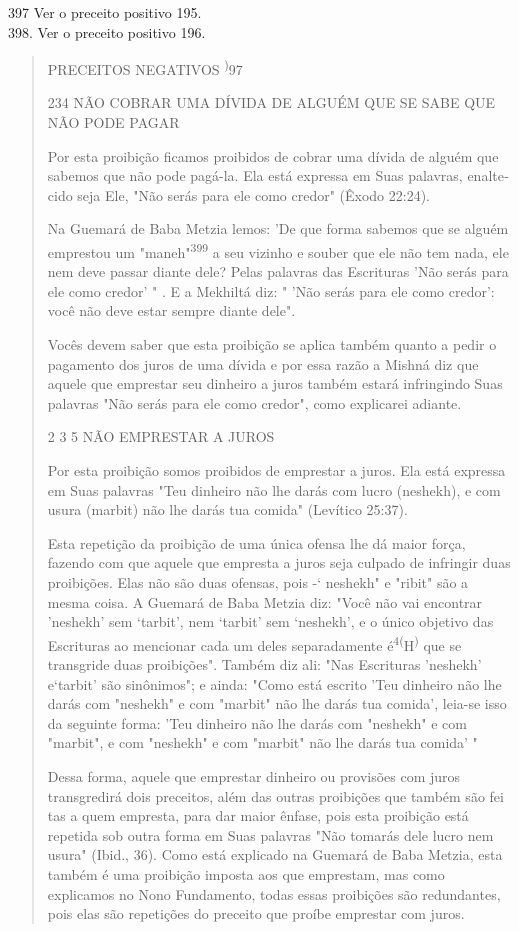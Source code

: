 397 Ver o preceito positivo 195.\\
398. Ver o preceito positivo 196.

\begin{quote}
PRECEITOS NEGATIVOS \textsuperscript{)}97

234 NÃO COBRAR UMA DÍVIDA DE ALGUÉM QUE SE SABE QUE NÃO PODE PAGAR

Por esta proibição ficamos proibidos de cobrar uma dívida de alguém que
sabemos que não pode pagá-la. Ela está expressa em Suas palavras,
enalte­cido seja Ele, "Não serás para ele como credor" (Êxodo 22:24).

Na Guemará de Baba Metzia lemos: 'De que forma sabemos que se alguém
emprestou um "maneh"\textsuperscript{399} a seu vizinho e souber que ele
não tem na­da, ele nem deve passar diante dele? Pelas palavras das
Escrituras 'Não serás para ele como credor' " . E a Mekhiltá diz: " 'Não
serás para ele como credor': você não deve estar sempre diante dele".

Vocês devem saber que esta proibição se aplica também quanto a pedir o
pagamento dos juros de uma dívida e por essa razão a Mishná diz que
aquele que emprestar seu dinheiro a juros também estará infringindo Suas
pala­vras "Não serás para ele como credor", como explicarei adiante.

2 3 5 NÃO EMPRESTAR A JUROS

Por esta proibição somos proibidos de emprestar a juros. Ela está
expressa em Suas palavras "Teu dinheiro não lhe darás com lucro
(neshekh), e com usura (marbit) não lhe darás tua comida" (Levítico
25:37).

Esta repetição da proibição de uma única ofensa lhe dá maior força,
fazendo com que aquele que empresta a juros seja culpado de infringir
duas proibições. Elas não são duas ofensas, pois -` neshekh" e "ribit"
são a mesma coisa. A Guemará de Baba Metzia diz: "Você não vai encontrar
'neshekh' sem `tarbit', nem `tarbit' sem `neshekh', e o único objetivo
das Escrituras ao men­cionar cada um deles separadamente
é\textsuperscript{4(}H\textsuperscript{)} que se transgride duas
proibições". Também diz ali: "Nas Escrituras 'neshekh' e`tarbit' são
sinônimos"; e ainda: "Como está escrito 'Teu dinheiro não lhe darás com
"neshekh" e com "mar­bit" não lhe darás tua comida', leia-se isso da
seguinte forma: 'Teu dinheiro não lhe darás com "neshekh" e com
"marbit", e com "neshekh" e com "mar­bit" não lhe darás tua comida' "

Dessa forma, aquele que emprestar dinheiro ou provisões com ju­ros
transgredirá dois preceitos, além das outras proibições que também são
fei tas a quem empresta, para dar maior ênfase, pois esta proibição está
repetida sob outra forma em Suas palavras "Não tomarás dele lucro nem
usura" (Ibid., 36). Como está explicado na Guemará de Baba Metzia, esta
também é uma proi­bição imposta aos que emprestam, mas como explicamos
no Nono Fundamen­to, todas essas proibições são redundantes, pois elas
são repetições do preceito que proíbe emprestar com juros.
\end{quote}

